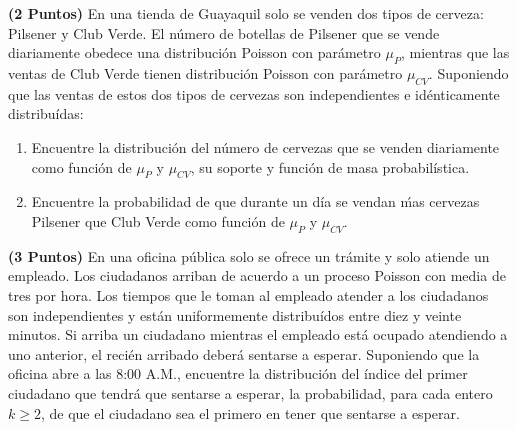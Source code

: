 \documentclass[ a4paper, twoside, 11pt]{article}
\begin{document}
\begin{problem}
\textbf{(2 Puntos)} En una tienda de Guayaquil solo se venden dos tipos de cerveza: Pilsener y Club Verde. El n\'umero de botellas de Pilsener que se vende diariamente obedece una distribuci\'on Poisson con par\'ametro $\mu_P$, mientras que las ventas de Club Verde tienen distribuci\'on Poisson con par\'ametro $\mu_{CV}$. Suponiendo que las ventas de estos dos tipos de cervezas son independientes e id\'enticamente distribu\'idas: 
\begin{enumerate}[label=\alph*)]
\item Encuentre la distribuci\'on del n\'umero de cervezas que se venden diariamente como funci\'on de $\mu_{P}$ y $\mu_{CV}$, \ie su soporte y funci\'on de masa probabil\'istica. 
\item Encuentre la probabilidad de que durante un d\'ia se vendan \'mas cervezas Pilsener que Club Verde como funci\'on de $\mu_{P}$ y $\mu_{CV}$. 
\end{enumerate}

\end{problem}
\vspace{\baselineskip}

\begin{problem}
\textbf{(3 Puntos)} En una oficina p\'ublica solo se ofrece un tr\'amite y solo atiende un empleado. Los ciudadanos arriban de acuerdo a un proceso Poisson con media de tres por hora. \linebreak Los tiempos que le toman al empleado atender a los ciudadanos son independientes y est\'an uniformemente distribu\'idos entre diez y veinte minutos. Si arriba un ciudadano mientras el empleado est\'a ocupado atendiendo a uno anterior, el reci\'en arribado deber\'a sentarse a esperar.  Suponiendo que la oficina abre a las 8:00 A.M., encuentre la distribuci\'on del \'indice del primer ciudadano que tendr\'a que sentarse a esperar, \ie la probabilidad, para cada entero $k \geq 2$, \linebreak de que el \kavo ciudadano sea el primero en tener que sentarse a esperar. 

\end{problem}
\vspace{\baselineskip}
\end{document}
